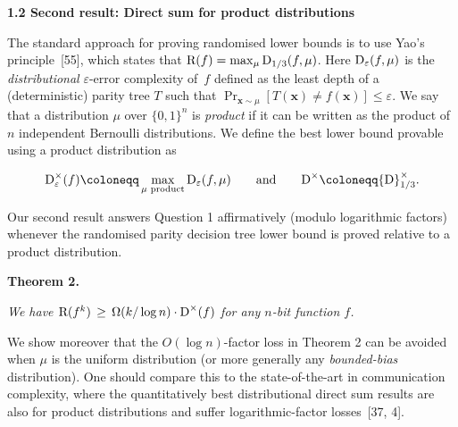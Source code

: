 \par\medskip\noindent\textbf{
1.2 Second result: Direct sum for product distributions}\par




The standard approach for proving randomised lower bounds is to use Yao’s principle [55], which states that ${\textup{R}}(f)=\max_{\mu}{\textup{D}}_{1/3}(f,\mu)$. Here ${\textup{D}}_{\varepsilon}(f,\mu)$ is the \emph{distributional} $\varepsilon$-error complexity of $f$ defined as the least depth of a (deterministic) parity tree $T$ such that $\Pr_{\bm{x}\sim\mu}[T(\bm{x})\neq f(\bm{x})]\leq\varepsilon$. We say that a distribution $\mu$ over $\{0,1\}^{n}$ is \emph{product} if it can be written as the product of $n$ independent Bernoulli distributions. We define the best lower bound provable using a product distribution as\par


\[\begin{gathered}
{\textup{D}}^{\times}_{\varepsilon}(f)\coloneqq\max_{\mu\text{ product}}{\textup{D}}_{\varepsilon}(f,\mu)\qquad\text{and}\qquad{\textup{D}}^{\times}\coloneqq{\textup{D}}^{\times}_{1/3}.
\end{gathered}\]


Our second result answers Question 1 affirmatively (modulo logarithmic factors) whenever the randomised parity decision tree lower bound is proved relative to a product distribution.\par





\par\medskip\noindent\textbf{
\textbf{Theorem 2}\textbf{.}
}\par



\emph{We have ${\textup{R}}(f^{k})\,\geq\,\Omega(k/\log n)\cdot{\textup{D}}^{\times}(f)$ for any $n$-bit function $f$.}\par






We show moreover that the $O(\log n)$-factor loss in Theorem 2 can be avoided when $\mu$ is the uniform distribution (or more generally any \emph{bounded-bias} distribution). One should compare this to the state-of-the-art in communication complexity, where the quantitatively best distributional direct sum results are also for product distributions and suffer logarithmic-factor losses [37, 4].\par




